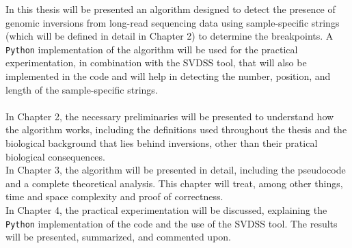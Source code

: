 In this thesis will be presented an algorithm designed to detect the presence of genomic inversions from long-read sequencing data using sample-specific strings (which will be defined in detail in Chapter 2) to determine the breakpoints. A \texttt{Python} implementation of the algorithm will be used for the practical experimentation, in combination with the SVDSS \cite{denti_svdss_2023} tool, that will also be implemented in the code and will help in detecting the number, position, and length of the sample-specific strings. \\
\\
In Chapter 2, the necessary preliminaries will be presented to understand how the algorithm works, including the definitions used throughout the thesis and the biological background that lies behind inversions, other than their pratical biological consequences. \\
In Chapter 3, the algorithm will be presented in detail, including the pseudocode and a complete theoretical analysis. This chapter will treat, among other things, time and space complexity and proof of correctness.\\
In Chapter 4, the practical experimentation will be discussed, explaining the \texttt{Python} implementation of the code and the use of the SVDSS tool. The results will be presented, summarized, and commented upon.

\bigskip
\bigskip

